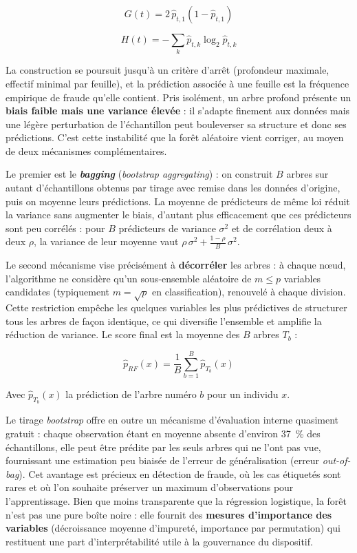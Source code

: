 \begin{equation}
    G(t) = 2\, \hat{p}_{t,1} (1 - \hat{p}_{t,1})
\end{equation}

\begin{equation}
    H(t) = - \sum_{k} \hat{p}_{t,k} \log_2 \hat{p}_{t,k}
\end{equation}

La construction se poursuit jusqu'à un critère d'arrêt (profondeur maximale, effectif minimal par feuille), et la prédiction associée à une feuille est la fréquence empirique de fraude qu'elle contient. Pris isolément, un arbre profond présente un \textbf{biais faible mais une variance élevée} : il s'adapte finement aux données mais une légère perturbation de l'échantillon peut bouleverser sa structure et donc ses prédictions. C'est cette instabilité que la forêt aléatoire vient corriger, au moyen de deux mécanismes complémentaires.

Le premier est le \textbf{\textit{bagging}} (\textit{bootstrap aggregating}) : on construit $B$ arbres sur autant d'échantillons obtenus par tirage avec remise dans les données d'origine, puis on moyenne leurs prédictions. La moyenne de prédicteurs de même loi réduit la variance sans augmenter le biais, d'autant plus efficacement que ces prédicteurs sont peu corrélés : pour $B$ prédicteurs de variance $\sigma^2$ et de corrélation deux à deux $\rho$, la variance de leur moyenne vaut $\rho\,\sigma^2 + \frac{1-\rho}{B}\,\sigma^2$.

Le second mécanisme vise précisément à \textbf{décorréler} les arbres : à chaque nœud, l'algorithme ne considère qu'un sous-ensemble aléatoire de $m \leq p$ variables candidates (typiquement $m = \sqrt{p}$ en classification), renouvelé à chaque division. Cette restriction empêche les quelques variables les plus prédictives de structurer tous les arbres de façon identique, ce qui diversifie l'ensemble et amplifie la réduction de variance. Le score final est la moyenne des $B$ arbres $T_b$ :

\begin{equation}
    \hat{p}_{RF}(x) = \frac{1}{B} \sum_{b=1}^{B} \hat{p}_{T_b}(x)
\end{equation}

Avec $\hat{p}_{T_b}(x)$ la prédiction de l'arbre numéro $b$ pour un individu $x$.

Le tirage \textit{bootstrap} offre en outre un mécanisme d'évaluation interne quasiment gratuit : chaque observation étant en moyenne absente d'environ 37~\% des échantillons, elle peut être prédite par les seuls arbres qui ne l'ont pas vue, fournissant une estimation peu biaisée de l'erreur de généralisation (erreur \textit{out-of-bag}). Cet avantage est précieux en détection de fraude, où les cas étiquetés sont rares et où l'on souhaite préserver un maximum d'observations pour l'apprentissage. Bien que moins transparente que la régression logistique, la forêt n'est pas une pure boîte noire : elle fournit des \textbf{mesures d'importance des variables} (décroissance moyenne d'impureté, importance par permutation) qui restituent une part d'interprétabilité utile à la gouvernance du dispositif.

